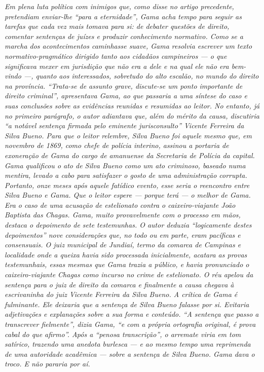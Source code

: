 \begin{didascalia}
\emph{Em plena luta política com inimigos que, como disse no artigo
precedente, pretendiam enviar-lhe ``para a eternidade'', Gama acha tempo
para seguir as tarefas que cada vez mais tomava para si: de debater
questões de direito, comentar sentenças de juízes e produzir
conhecimento normativo. Como se a marcha dos acontecimentos caminhasse
suave, Gama resolvia escrever um texto normativo-pragmático dirigido
tanto aos cidadãos campineiros --- o que significava mexer em jurisdição
que não era a dele e na qual ele não era bem-vindo ---, quanto aos
interessados, sobretudo do alto escalão, no mundo do direito na
província. ``Trata-se de assunto grave, discute-se um ponto importante de
direito criminal'', apresentava Gama, ao que passaria a uma síntese do
caso e suas conclusões sobre as evidências reunidas e resumidas ao
leitor. No entanto, já no primeiro parágrafo, o autor adiantava que,
além do mérito da causa, discutiria ``a notável sentença firmada pelo
eminente jurisconsulto'' Vicente Ferreira da Silva Bueno. Para que o
leitor relembre, Silva Bueno foi aquele mesmo que, em novembro de 1869,
como chefe de polícia interino, assinou a portaria de exoneração de Gama
do cargo de amanuense da Secretaria de Polícia da capital. Gama
qualificou o ato de Silva Bueno como um ato criminoso, baseado numa
mentira, levado a cabo para satisfazer o gosto de uma administração
corrupta. Portanto, onze meses após aquele fatídico evento, esse seria o
reencontro entre Silva Bueno e Gama. Que o leitor espere --- porque terá
--- o melhor de Gama. Era o caso de uma acusação de estelionato contra o
caixeiro-viajante João Baptista das Chagas. Gama, muito provavelmente
com o processo em mãos, destaca o depoimento de sete testemunhas. O
autor deduzia ``logicamente destes depoimentos'' nove considerações que,
no todo ou em parte, eram pacíficas e consensuais. O juiz municipal de
Jundiaí, termo da comarca de Campinas e localidade onde a queixa havia
sido processada inicialmente, acatara as provas testemunhais, essas
mesmas que Gama trazia a público, e havia pronunciado o
caixeiro-viajante Chagas como incurso no crime de estelionato. O réu
apelou da sentença para o juiz de direito da comarca e finalmente a
causa chegava à escrivaninha do juiz Vicente Ferreira da Silva Bueno. A
crítica de Gama é fulminante. Ele deixaria que a sentença de Silva Bueno
falasse por si. Evitaria adjetivações e explanações sobre a sua forma e
conteúdo. ``A sentença que passo a transcrever fielmente'', dizia Gama, ``e
com a própria ortografia original, é prova cabal do que afirmo''. Após a
``penosa transcrição'', o arremate viria em tom satírico, trazendo uma
anedota burlesca --- e ao mesmo tempo uma reprimenda de uma autoridade
acadêmica --- sobre a sentença de Silva Bueno. Gama dava o troco. E não
pararia por aí.}
\end{didascalia}


